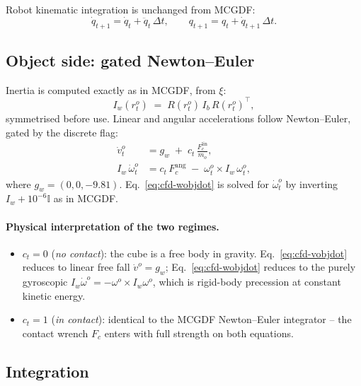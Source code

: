 \documentclass[11pt]{article}
\begin{document}
Robot kinematic integration is unchanged from MCGDF:
\begin{equation}
  \dot q_{t+1} = \dot q_t + \ddot q_t\,\Delta t,
  \qquad
  q_{t+1} = q_t + \dot q_{t+1}\,\Delta t.
\end{equation}

\subsection{Object side: gated Newton--Euler}

Inertia is computed exactly as in MCGDF, from $\xi$:
\begin{equation}
  I_w(r^o_t)
  \;=\; R(r^o_t)\,I_b\,R(r^o_t)^\top,
\end{equation}
symmetrised before use.  Linear and angular accelerations follow
Newton--Euler, gated by the discrete flag:
\begin{align}
  \dot v^o_t
    &= g_w \;+\; c_t\,\frac{F_c^{\mathrm{lin}}}{m_o},
    \label{eq:cfd-vobjdot}\\
  I_w\,\dot \omega^o_t
    &= c_t\,F_c^{\mathrm{ang}} \;-\; \omega^o_t \times I_w\,\omega^o_t,
    \label{eq:cfd-wobjdot}
\end{align}
where $g_w = (0, 0, -9.81)$.  Eq.~\eqref{eq:cfd-wobjdot} is solved
for $\dot \omega^o_t$ by inverting $I_w + 10^{-6}\mathbb{I}$ as in
MCGDF.

\paragraph{Physical interpretation of the two regimes.}
\begin{itemize}
  \item $c_t = 0$ (\emph{no contact}): the cube is a free body in
    gravity.  Eq.~\eqref{eq:cfd-vobjdot} reduces to linear free fall
    $\dot v^o = g_w$; Eq.~\eqref{eq:cfd-wobjdot} reduces to the
    purely gyroscopic
    $I_w \dot \omega^o = -\omega^o \times I_w \omega^o$, which is
    rigid-body precession at constant kinetic energy.
  \item $c_t = 1$ (\emph{in contact}): identical to the MCGDF
    Newton--Euler integrator -- the contact wrench $F_c$ enters with
    full strength on both equations.
\end{itemize}

\subsection{Integration}
\end{document}
